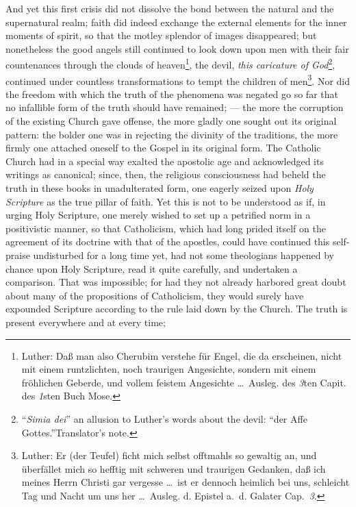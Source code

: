\documentclass[12pt]{book}
\newcommand{\opage}[1]{\marginnote{\footnotesize\textit{[#1]}}}
\begin{document}
And yet this first crisis did not dissolve the bond between the natural and the
supernatural realm; faith did indeed exchange the external elements for the
inner moments of spirit, so that the motley splendor of images disappeared; but
nonetheless the good angels still continued to look down upon men with their
fair countenances through the clouds of heaven\footnote{Luther: Daß man also
Cherubim verstehe für Engel, die da erscheinen, nicht mit einem runtzlichten,
noch traurigen Angesichte, sondern mit einem fröhlichen Geberde, und vollem
feistem Angesichte \ldots\ Ausleg. des \textit{3}ten Capit. des \textit{1}sten
Buch Mose.}, the devil, \emph{this caricature of God}\footnote{``\textit{Simia
dei}'' an allusion to Luther's words about the devil: ``der Affe
Gottes.''\hfill Translator's note.}, continued under countless transformations
to tempt the children of men\footnote{Luther: Er (der Teufel) ficht mich selbst
offtmahls so gewaltig an, und überfället mich so hefftig mit schweren und
traurigen Gedanken, daß ich meines Herrn Christi gar vergesse \ldots\ ist er
dennoch heimlich bei uns, schleicht Tag und Nacht um uns her \ldots\ Ausleg. d.
Epistel a.~d. Galater Cap.~\textit{3}.}.
Nor did the freedom with which the truth of the phenomena was negated go so far
that no infallible form of the truth should have remained; --- the more the
corruption of the existing Church gave offense, the more gladly one sought out
its original pattern: the bolder one was in rejecting the divinity of the
traditions, the more firmly one attached oneself to the Gospel in its original
form. The Catholic Church had in a special way exalted the apostolic age and
acknowledged its writings as canonical; since, then, the religious
consciousness had beheld the truth in these books in unadulterated form, one
eagerly seized upon \emph{Holy Scripture} as the true pillar of faith.
\opage{64} \setcounter{footnote}{0}%
Yet this is not to be understood as if, in urging Holy Scripture, one merely
wished to set up a petrified norm in a positivistic manner, so that
Catholicism, which had long prided itself on the agreement of its doctrine with
that of the apostles, could have continued this self-praise undisturbed for a
long time yet, had not some theologians happened by chance upon Holy Scripture,
read it quite carefully, and undertaken a comparison. That was impossible; for
had they not already harbored great doubt about many of the propositions of
Catholicism, they would surely have expounded Scripture according to the rule
laid down by the Church. The truth is present everywhere and at every time;
\end{document}
